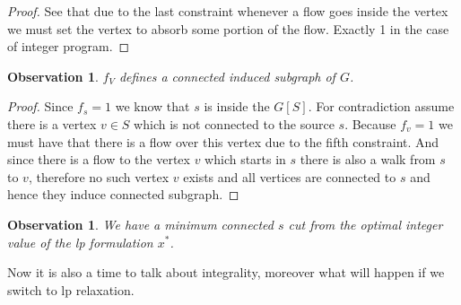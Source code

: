 \documentclass{article}
\theoremstyle{plain}
\newtheorem{observ}[thm]{Observation}
\theoremstyle{plain}
\theoremstyle{remark}
\begin{document}
	\begin{proof}
		See that due to the last constraint whenever a flow goes inside the vertex we must set the vertex to absorb some portion of the flow. Exactly 1 in the case of integer program.
	\end{proof}

	\begin{observ}
		$f_V$ defines a connected induced subgraph of $G$.
	\end{observ}

	\begin{proof}
		Since $f_s = 1$ we know that $s$ is inside the $G[S]$. For contradiction assume there is a vertex $v \in S$ which is not connected to the source $s$. Because $f_v = 1$ we must have that there is a flow over this vertex due to the fifth constraint. And since there is a flow to the vertex $v$ which starts in $s$ there is also a walk from $s$ to $v$, therefore no such vertex $v$ exists and all vertices are connected to $s$ and hence they induce connected subgraph.
	\end{proof}

	\begin{observ}
		We have a minimum connected $s$ cut from the optimal integer value of the lp formulation $x^\ast$.
	\end{observ}

	Now it is also a time to talk about integrality, moreover what will happen if we switch to lp relaxation.
	
\end{document}
